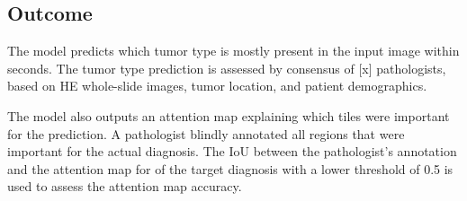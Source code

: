 \subsection{Outcome}

The model predicts which tumor type is mostly present in the input image within seconds.
The tumor type prediction is assessed by consensus of [x] pathologists, based on HE whole-slide images, tumor location, and patient demographics.

The model also outputs an attention map explaining which tiles were important for the prediction.
A pathologist blindly annotated all regions that were important for the actual diagnosis.
The IoU between the pathologist's annotation and the attention map for of the target diagnosis with a lower threshold of 0.5 is used to assess the attention map accuracy.
